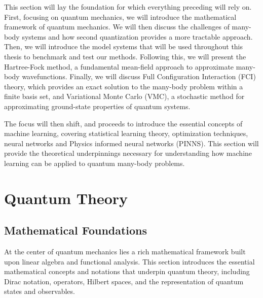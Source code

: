 \graphicspath{{../results/figures/theory/}}
This section will lay the foundation for which everything preceding will rely on. First, focusing on quantum mechanics, we will introduce the mathematical framework of quantum mechanics.
 We will then discuss the challenges of many-body systems and how second quantization provides a more tractable approach. 
Then, we will introduce the model systems that will be used throughout this thesis to benchmark and test our methods. Following this, we will present the Hartree-Fock method, a fundamental mean-field approach to approximate many-body wavefunctions.
 Finally, we will discuss Full Configuration Interaction (FCI) theory, which provides an exact solution to the many-body problem within a finite basis set, and Variational Monte Carlo (VMC), a stochastic method for approximating ground-state properties of quantum systems.

 The focus will then shift, and proceeds to introduce the essential concepts of machine learning, covering statistical learning theory, optimization techniques, neural networks and Physics informed neural networks (PINNS). This section will provide the theoretical underpinnings necessary for understanding how machine learning can be applied to quantum many-body problems.

\chapter{Quantum Theory}
\label{sec:theory}

\section{Mathematical Foundations}
At the center of quantum mechanics lies a rich mathematical framework built upon linear algebra and functional analysis. This section introduces the essential mathematical concepts and notations that underpin quantum theory, including Dirac notation, operators, Hilbert spaces, and the representation of quantum states and observables.
